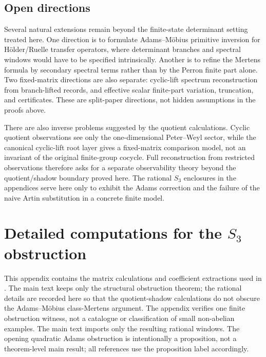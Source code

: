 \documentclass[11pt,a4paper]{amsart}
\theoremstyle{plain}
\theoremstyle{definition}
\theoremstyle{remark}
\begin{document}
\subsection{Open directions}

Several natural extensions remain beyond the finite-state determinant setting
treated here.  One direction is to formulate Adams--M\"obius primitive inversion
for H\"older/Ruelle transfer operators, where determinant branches and spectral
windows would have to be specified intrinsically.  Another is to refine the
Mertens formula by secondary spectral terms rather than by the Perron finite
part alone.  Two fixed-matrix directions are also separate: cyclic-lift
spectrum reconstruction from branch-lifted records, and effective scalar
finite-part variation, truncation, and certificates.  These are split-paper
directions, not hidden assumptions in the proofs above.

There are also inverse problems suggested by the quotient calculations.  Cyclic
quotient observations see only the one-dimensional Peter--Weyl sector, while the
canonical cyclic-lift root layer gives a fixed-matrix comparison model, not an
invariant of the original finite-group cocycle.  Full reconstruction from
restricted observations therefore asks for a separate observability theory
beyond the quotient/shadow boundary proved here.  The rational
\(S_3\) enclosures in the appendices serve
here only to exhibit the Adams correction and the failure of the naive Artin
substitution in a concrete finite model.


\appendix
\section[Detailed computations for the S3 obstruction]{Detailed computations for the \texorpdfstring{$S_3$}{S3} obstruction}
\label{app:s3-model-computations}

This appendix contains the matrix calculations and coefficient extractions
used in . The main text keeps only the structural
obstruction theorem; the rational details are recorded here so that the
quotient-shadow calculations do not obscure the Adams--M\"obius class-Mertens
argument.  The appendix verifies one finite obstruction witness, not a
catalogue or classification of small non-abelian examples.  The main text
imports only the resulting rational windows.
The opening quadratic Adams obstruction is intentionally a proposition,
not a theorem-level main result; all references use the proposition label
accordingly.
\end{document}
